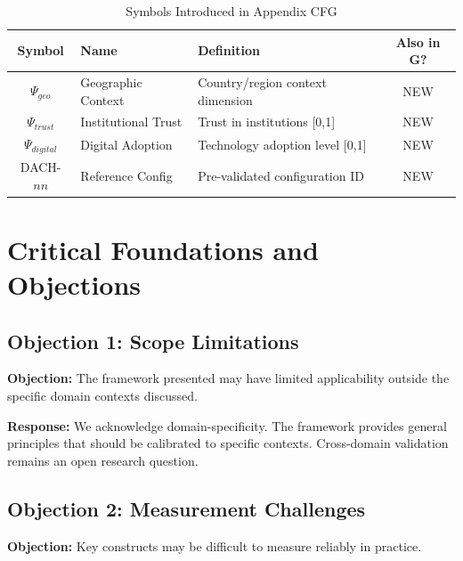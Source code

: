 \vspace{0.5em}

\begin{table}[htbp]
\centering
\caption{Symbols Introduced in Appendix CFG}
\label{tab:ggg-symbols}
\renewcommand{\arraystretch}{1.3}
\begin{tabular}{@{}clp{6cm}c@{}}
\toprule
\textbf{Symbol} & \textbf{Name} & \textbf{Definition} & \textbf{Also in G?} \\
\midrule
$\Psi_{geo}$ & Geographic Context & Country/region context dimension & NEW \\
$\Psi_{trust}$ & Institutional Trust & Trust in institutions [0,1] & NEW \\
$\Psi_{digital}$ & Digital Adoption & Technology adoption level [0,1] & NEW \\
DACH-$nn$ & Reference Config & Pre-validated configuration ID & NEW \\
\bottomrule
\end{tabular}
\end{table}



\section{Critical Foundations and Objections}
\label{sec:cfg-foundations}

\subsection{Objection 1: Scope Limitations}

\textbf{Objection:} The framework presented may have limited applicability
outside the specific domain contexts discussed.

\textbf{Response:} We acknowledge domain-specificity. The framework provides
general principles that should be calibrated to specific contexts. Cross-domain
validation remains an open research question.

\subsection{Objection 2: Measurement Challenges}

\textbf{Objection:} Key constructs may be difficult to measure reliably in
practice.

